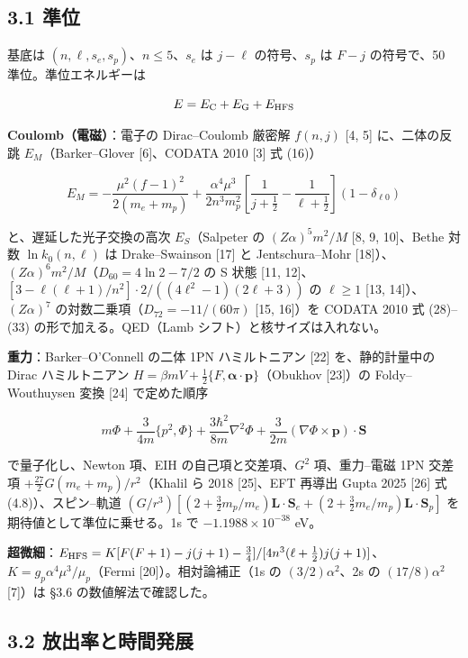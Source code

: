 \documentclass[
  a4paper,
]{ltjsarticle}
\begin{document}
\subsection{3.1 準位}\label{ux6e96ux4f4d}

基底は \((n,\ell,s_e,s_p)\)、\(n\le5\)、\(s_e\) は \(j-\ell\)
の符号、\(s_p\) は \(F-j\) の符号で、50 準位。準位エネルギーは

\[
E = E_{\rm C} + E_{\rm G} + E_{\rm HFS}
\]

\textbf{Coulomb（電磁）}：電子の Dirac--Coulomb 厳密解 \(f(n,j)\) {[}4,
5{]} に、二体の反跳 \(E_M\)（Barker--Glover {[}6{]}、CODATA 2010 {[}3{]}
式 (16)）

\[
E_M=-\frac{\mu^2(f-1)^2}{2(m_e+m_p)}+\frac{\alpha^4\mu^3}{2n^3m_p^2}\left[\frac{1}{j+\tfrac12}-\frac{1}{\ell+\tfrac12}\right](1-\delta_{\ell0})
\]

と、遅延した光子交換の高次 \(E_S\)（Salpeter の \((Z\alpha)^5m^2/M\)
{[}8, 9, 10{]}、Bethe 対数 \(\ln k_0(n,\ell)\) は Drake--Swainson
{[}17{]} と Jentschura--Mohr
{[}18{]}）、\((Z\alpha)^6m^2/M\)（\(D_{60}=4\ln2-7/2\) の S 状態 {[}11,
12{]}、\([3-\ell(\ell+1)/n^2]\cdot2/((4\ell^2-1)(2\ell+3))\) の
\(\ell\ge1\) {[}13, 14{]}）、\((Z\alpha)^7\)
の対数二乗項（\(D_{72}=-11/(60\pi)\) {[}15, 16{]}）を CODATA 2010 式
(28)--(33) の形で加える。QED（Lamb シフト）と核サイズは入れない。

\textbf{重力}：Barker--O'Connell の二体 1PN ハミルトニアン {[}22{]}
を、静的計量中の Dirac ハミルトニアン
\(H=\beta mV+\tfrac12\{F,\boldsymbol\alpha\cdot\mathbf p\}\)（Obukhov
{[}23{]}）の Foldy--Wouthuysen 変換 {[}24{]} で定めた順序

\[
m\Phi+\frac{3}{4m}\{p^2,\Phi\}+\frac{3\hbar^2}{8m}\nabla^2\Phi+\frac{3}{2m}(\nabla\Phi\times\mathbf p)\cdot\mathbf S
\]

で量子化し、Newton 項、EIH の自己項と交差項、\(G^2\) 項、重力--電磁 1PN
交差項 \(+\tfrac{27}{2}G(m_e+m_p)/r^2\)（Khalil ら 2018 {[}25{]}、EFT
再導出 Gupta 2025 {[}26{]} 式 (4.8)）、スピン--軌道
\((G/r^3)[(2+\tfrac32m_p/m_e)\mathbf L\cdot\mathbf S_e+(2+\tfrac32m_e/m_p)\mathbf L\cdot\mathbf S_p]\)
を期待値として準位に乗せる。1s で \(-1.1988\times10^{-38}\) eV。

\textbf{超微細}：\(E_{\rm HFS}=K[F(F+1)-j(j+1)-\tfrac34]/[4n^3(\ell+\tfrac12)j(j+1)]\)、\(K=g_p\alpha^4\mu^3/\mu_p\)（Fermi
{[}20{]}）。相対論補正（1s の \((3/2)\alpha^2\)、2s の
\((17/8)\alpha^2\) {[}7{]}）は §3.6 の数値解法で確認した。

\subsection{3.2
放出率と時間発展}\label{ux653eux51faux7387ux3068ux6642ux9593ux767aux5c55}
\end{document}
